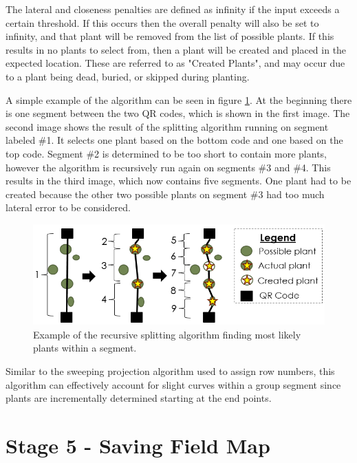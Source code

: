 The lateral and closeness penalties are defined as infinity if the input exceeds a certain threshold.  If this occurs then the overall penalty will also be set to infinity, and that plant will be removed from the list of possible plants.  If this results in no plants to select from, then a plant will be created and placed in the expected location.  These are referred to as "Created Plants", and may occur due to a plant being dead, buried, or skipped during planting.  

A simple example of the algorithm can be seen in figure \ref{figure:recursive_algorithm}.  At the beginning there is one segment between the two QR codes, which is shown in the first image.  The second image shows the result of the splitting algorithm running on segment labeled \#1. It selects one plant based on the bottom code and one based on the top code.  Segment \#2 is determined to be too short to contain more plants, however the algorithm is recursively run again on segments \#3 and \#4.  This results in the third image, which now contains five segments.  One plant had to be created because the other two possible plants on segment \#3 had too much lateral error to be considered.   

\begin{figure}[hb]
	\centering
    \includegraphics[width=5in]{figures/recursive_algorithm2.png}
    \caption[Recursive splitting algorithm]{Example of the recursive splitting algorithm finding most likely plants within a segment.}
    \label{figure:recursive_algorithm}
\end{figure}

Similar to the sweeping projection algorithm used to assign row numbers, this algorithm can effectively account for slight curves within a group segment since plants are incrementally determined starting at the end points. 

\section{Stage 5 - Saving Field Map}
\label{processing-stage5}

